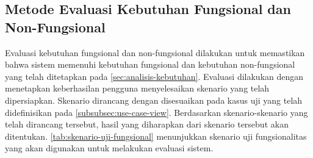 \subsection{Metode Evaluasi Kebutuhan Fungsional dan Non-Fungsional}
\label{subsec:evaluasi-kebutuhan-fungsional-dan-non-fungsional}
Evaluasi kebutuhan fungsional dan non-fungsional dilakukan untuk memastikan bahwa sistem memenuhi kebutuhan fungsional dan kebutuhan non-fungsional yang telah ditetapkan pada \autoref{sec:analisis-kebutuhan}. Evaluasi dilakukan dengan menetapkan keberhasilan pengguna menyelesaikan skenario yang telah dipersiapkan. Skenario dirancang dengan disesuaikan pada kasus uji yang telah didefinisikan pada \autoref{subsubsec:use-case-view}. Berdasarkan skenario-skenario yang telah dirancang tersebut, hasil yang diharapkan dari skenario tersebut akan ditentukan. \autoref{tab:skenario-uji-fungsional} menunjukkan skenario uji fungsionalitas yang akan digunakan untuk melakukan evaluasi sistem.
